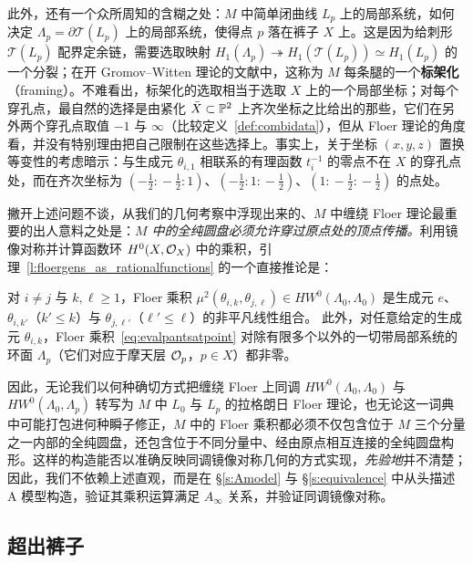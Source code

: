 此外，还有一个众所周知的含糊之处：$M$ 中简单闭曲线 $L_p$ 上的局部系统，如何决定 $\Lambda_p=\partial\mathcal{T}(L_p)$ 上的局部系统，使得点 $p$ 落在裤子 $X$ 上。这是因为给刺形 $\mathcal{T}(L_p)$ 配界定余链，需要选取映射 $H_1(\Lambda_p)\twoheadrightarrow H_1(\mathcal{T}(L_p))\simeq H_1(L_p)$ 的一个分裂；在开 Gromov--Witten 理论的文献中，这称为 $M$ 每条腿的一个\textbf{标架化}（framing）。不难看出，标架化的选取相当于选取 $X$ 上的一个局部坐标；对每个穿孔点，最自然的选择是由紧化 $\bar X\subset\mathbb{P}^2$ 上齐次坐标之比给出的那些，它们在另外两个穿孔点取值 $-1$ 与 $\infty$（比较定义~\ref{def:combidata}），但从 Floer 理论的角度看，并没有特别理由把自己限制在这些选择上。事实上，关于坐标 $(x,y,z)$ 置换等变性的考虑暗示：与生成元 $\theta_{i,1}$ 相联系的有理函数 $t_i^{-1}$ 的零点不在 $X$ 的穿孔点处，而在齐次坐标为 $(-\tfrac12\!:\!-\tfrac12\!:\!1)$、$(-\tfrac12\!:\!1\!:\!-\tfrac12)$、$(1\!:\!-\tfrac12\!:\!-\tfrac12)$ 的点处。

撇开上述问题不谈，从我们的几何考察中浮现出来的、$M$ 中缠绕 Floer 理论最重要的出人意料之处是：\emph{$M$ 中的全纯圆盘必须允许穿过原点处的顶点传播。}利用镜像对称并计算函数环 $H^0(X,\mathcal{O}_X)$ 中的乘积，引理~\ref{l:floergens_as_rationalfunctions} 的一个直接推论是：

\begin{lemma}\label{l:mu2pants}
对 $i\ne j$ 与 $k,\ell\ge 1$，Floer 乘积 $\mu^2(\theta_{i,k},\theta_{j,\ell})\in HW^0(\Lambda_0,\Lambda_0)$ 是生成元 $e$、$\theta_{i,k'}$（$k'\le k$）与 $\theta_{j,\ell'}$（$\ell'\le\ell$）的非平凡线性组合。
此外，对任意给定的生成元 $\theta_{i,k}$，Floer 乘积~\eqref{eq:evalpantsatpoint} 对除有限多个以外的一切带局部系统的环面 $\Lambda_p$（它们对应于摩天层 $\mathcal{O}_p$，$p\in X$）都非零。
\end{lemma}

因此，无论我们以何种确切方式把缠绕 Floer 上同调 $HW^0(\Lambda_0,\Lambda_0)$ 与 $HW^0(\Lambda_0,\Lambda_p)$ 转写为 $M$ 中 $L_0$ 与 $L_p$ 的拉格朗日 Floer 理论，也无论这一词典中可能打包进何种瞬子修正，$M$ 中的 Floer 乘积都必须不仅包含位于 $M$ 三个分量之一内部的全纯圆盘，还包含位于不同分量中、经由原点相互连接的全纯圆盘构形。这样的构造能否以准确反映同调镜像对称几何的方式实现，\emph{先验地}并不清楚；因此，我们不依赖上述直观，而是在 §\ref{s:Amodel} 与 §\ref{s:equivalence} 中从头描述 A 模型构造，验证其乘积运算满足 $A_\infty$ 关系，并验证同调镜像对称。

\subsection{超出裤子}\label{ss:beyondpants}

